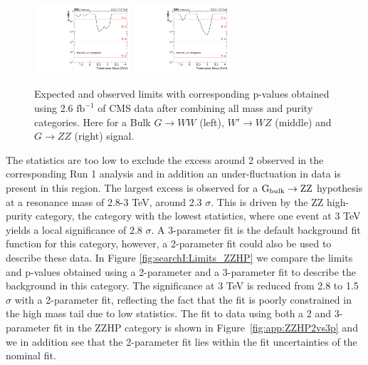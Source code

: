 \begin{figure}[h!]
\includegraphics[width=0.32\textwidth]{figures/analysis/search1/AN-15-211/pvalues/pvalue_WZin_combined_new.pdf}
\includegraphics[width=0.32\textwidth]{figures/analysis/search1/AN-15-211/pvalues/pvalue_BulkZZin_combined_new.pdf}\\
\caption{Expected and observed limits with corresponding p-values obtained using 2.6 $\textrm{fb}^{-1}$ of CMS data after combining all mass and purity categories. Here for a Bulk $G\rightarrow WW$ (left), $W'\rightarrow WZ$ (middle) and $G\rightarrow ZZ$ (right) signal.}
\label{fig:searchI:Limits_CombNew}
\end{figure}


The statistics are too low to exclude the excess around 2 \TeV observed in the corresponding Run 1 analysis and in addition an under-fluctuation in data is present in this region. The largest excess is observed for a $\mathrm{G}_\mathrm{bulk} \rightarrow \mathrm{Z}\mathrm{Z}$ hypothesis at a resonance mass of 2.8-3 TeV, around 2.3 $\sigma$.
This is driven by the ZZ high-purity category, the category with the lowest statistics, where one event at 3 TeV yields a local significance of 2.8 $\sigma$. A 3-parameter fit is the default background fit function for this category, however, a 2-parameter fit could also be used to describe these data. In Figure \ref{fig:searchI:Limits_ZZHP} we compare the limits and p-values obtained using a 2-parameter and a 3-parameter fit to describe the background in this category. The significance at 3 TeV is reduced from 2.8 to 1.5 $\sigma$ with a 2-parameter fit, reflecting the fact that the fit is poorly constrained in the high mass tail due to low statistics. The fit to data using both a 2 and 3-parameter fit in the ZZHP category is shown in Figure~\ref{fig:app:ZZHP2vs3p} and we in addition see that the 2-parameter fit lies within the fit uncertainties of the nominal fit.\newline
\newline

